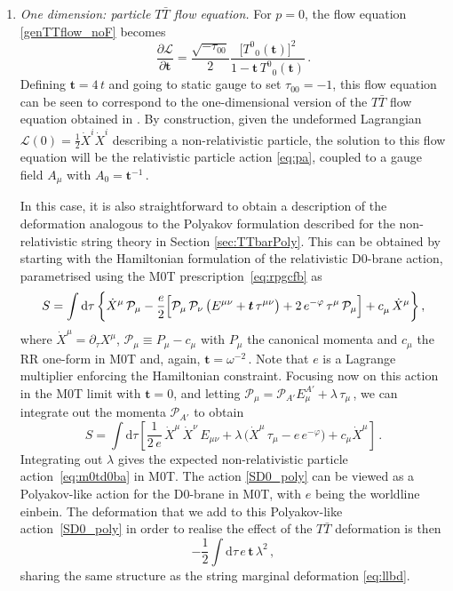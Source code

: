 \documentclass[11pt]{article}
\newcommand{\be}{\begin{equation}}
\newcommand{\ee}{\end{equation}}
\newcommand{\CP}{\mathcal{P}}
\renewcommand{\emph}[1]{\textit{#1}}
\newcommand{\dd}{\mathrm{d}}
\newcommand{\lambdap}{\boldsymbol{t}}
\begin{document}
\begin{enumerate}[(1)]

\item \emph{One dimension: particle $T\bar{T}$ flow equation.} For $p=0$, the flow equation \eqref{genTTflow_noF} becomes 
%
\be
    \frac{\partial \mathcal{L}}{\partial \lambdap} 
    = \frac{\sqrt{- \tau^{}_{00}}}{2} \frac{\bigl[ T^0{}_0 (\lambdap) \bigr]^2}{1 - \lambdap \, T^0{}_0(\lambdap)}\,.
\ee
%
Defining $\lambdap=4 \, t$ and going to static gauge to set $\tau^{}_{00} = -1$, this flow equation can be seen to correspond to the
one-dimensional version of the $T\bar T$ flow equation obtained in \cite{Gross:2019ach}. By construction, given the undeformed Lagrangian $\mathcal{L}(0) = \frac{1}{2} \dot{X}^i \dot{X}^i$ describing a non-relativistic particle, the solution to this flow equation will be the relativistic particle action \eqref{eq:pa}, coupled to a gauge field $A_\mu$ with $A_0 = \lambdap^{-1}$\,.

In this case, it is also straightforward to obtain a description of the deformation analogous to the Polyakov formulation described for the non-relativistic string theory in Section \ref{sec:TTbarPoly}.
This can be obtained by starting with the Hamiltonian formulation of the relativistic D0-brane action, parametrised using the M0T prescription~\eqref{eq:rpgcfb} as 
%
\be
    S = \int \dd \tau \, \biggl\{ \dot{X}^\mu \, \CP_\mu - \frac{e}{2} \Bigl[ \CP_\mu \, \CP_\nu \, \bigl( E^{\mu\nu} + \lambdap \, \tau^{\mu\nu} \bigr) + 2 \, e^{-\varphi} \,  \tau^\mu \, \CP_\mu \Bigr] + c^{}_\mu \, \dot{X}^\mu \biggr\}\,,
\ee
%
where $\dot{X}^\mu = \partial_\tau X^\mu$, $\CP^{}_\mu \equiv P^{}_\mu - c^{}_\mu$ with $P_\mu$ the canonical momenta and $c^{}_\mu$ the RR one-form in M0T and, again, $\lambdap=\omega^{-2}$\,. 
Note that $e$ is a Lagrange multiplier enforcing the Hamiltonian constraint.
Focusing now on this action in the M0T limit with $\lambdap=0$, 
and letting $\mathcal{P}_\mu = \mathcal{P}_{A'} E^{A'}_\mu + \lambda \, \tau_\mu$\,, we can integrate out the momenta $\mathcal{P}_{A'}$ to obtain 
%
\be \label{SD0_poly}
    S = \int \dd\tau \left[ \frac{1}{2 \, e} \, \dot{X}^\mu \, \dot{X}^\nu \, E_{\mu\nu} + \lambda \, \bigl( \dot{X}^\mu \, \tau_\mu - e  \,e^{-\varphi} \bigr)+ c_\mu \dot{X}^\mu \right] \,.
\ee
%
Integrating out $\lambda$ gives the expected non-relativistic particle action~\eqref{eq:m0td0ba} in M0T. The action \eqref{SD0_poly} can be viewed as a Polyakov-like action for the D0-brane in M0T, with $e$ being the worldline einbein.
The deformation that we add to this Polyakov-like action~\eqref{SD0_poly} in order to realise the effect of the $T\bar T$ deformation is then 
%
\be
    - \frac{1}{2} \int \dd \tau \, e \, \lambdap \, \lambda^2 \,,
\ee
%
sharing the same structure as the string marginal deformation \eqref{eq:llbd}.


\end{enumerate}
\end{document}

